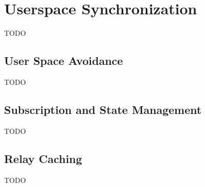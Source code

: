 \section{Userspace Synchronization}\label{sec:userspace_synchronization}
TODO

\subsection{User Space Avoidance}
TODO 

\subsection{Subscription and State Management}
TODO 

\subsection{Relay Caching}
TODO

